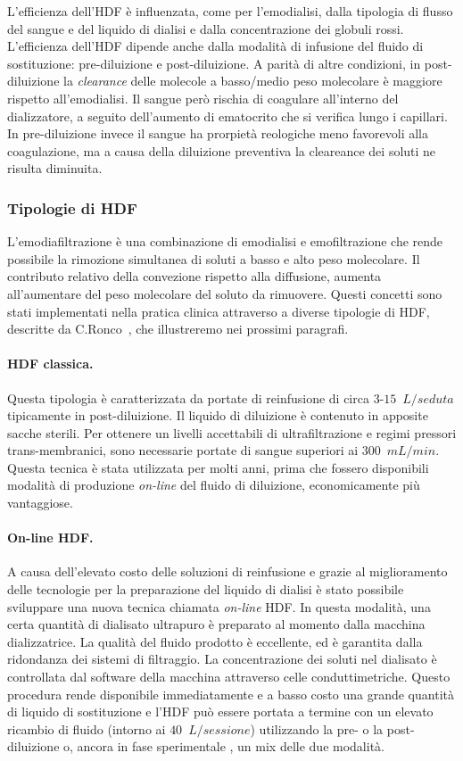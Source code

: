 L'efficienza dell'HDF è influenzata, come per l'emodialisi, dalla tipologia di flusso del sangue e del liquido di dialisi e dalla concentrazione dei globuli rossi. L'efficienza dell'HDF dipende anche dalla modalità di infusione del fluido di sostituzione: pre-diluizione e post-diluizione. A parità di altre condizioni, in post-diluizione la \textit{clearance} delle molecole a basso/medio peso molecolare è maggiore rispetto all'emodialisi. Il sangue però rischia di coagulare all'interno del dializzatore, a seguito dell'aumento di ematocrito che si verifica lungo i capillari. In pre-diluizione invece il sangue ha prorpietà reologiche meno favorevoli alla coagulazione, ma a causa della diluizione preventiva la cleareance dei soluti ne risulta diminuita.


\subsubsection{Tipologie di HDF}
L'emodiafiltrazione è una combinazione di emodialisi e emofiltrazione che rende possibile la rimozione simultanea di soluti a basso e alto peso molecolare. Il contributo relativo della convezione rispetto alla diffusione, aumenta all'aumentare del peso molecolare del soluto da rimuovere. Questi concetti sono stati implementati nella pratica clinica attraverso a diverse tipologie di HDF, descritte da C.Ronco~\cite{evolutionHDF}, che illustreremo nei prossimi paragrafi.


\paragraph{HDF classica.}
Questa tipologia è caratterizzata da portate di reinfusione di circa $3$-$15$~$L/seduta$ tipicamente in post-diluizione. Il liquido di diluizione è contenuto in apposite sacche sterili. Per ottenere un livelli accettabili di ultrafiltrazione e regimi pressori trans-membranici, sono necessarie portate di sangue superiori ai $300$~$mL/min$. Questa tecnica è stata utilizzata per molti anni, prima che fossero disponibili modalità di produzione \textit{on-line} del fluido di diluizione, economicamente più vantaggiose.

\paragraph{On-line HDF.}
A causa dell'elevato costo delle soluzioni di reinfusione e grazie al miglioramento delle tecnologie per la preparazione del liquido di dialisi è stato possibile sviluppare una nuova tecnica chiamata \textit{on-line} HDF. In questa modalità, una certa quantità di dialisato ultrapuro è preparato al momento dalla macchina dializzatrice. La qualità del fluido prodotto è eccellente, ed è garantita dalla ridondanza dei sistemi di filtraggio. La concentrazione dei soluti nel dialisato è controllata dal software della macchina attraverso celle conduttimetriche. Questo procedura rende disponibile immediatamente e a basso costo una grande quantità di liquido di sostituzione e l'HDF può essere portata a termine con un elevato ricambio di fluido (intorno ai $40$~$L/sessione$) utilizzando la pre- o la post-diluizione o, ancora in fase sperimentale \cite{pedrini}, un mix delle due modalità.

